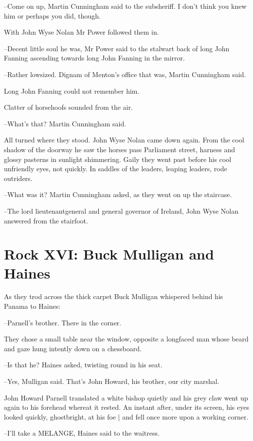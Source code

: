 --Come on up,
Martin Cunningham said to the subsheriff.
I don't think you
knew him
or perhaps you did, though.

With John Wyse Nolan
Mr Power followed them in.

--Decent little soul he was,
Mr Power said
to the stalwart back of long
John Fanning
ascending towards long John Fanning in the mirror.

--Rather lowsized.
Dignam of Menton's office that was,
Martin Cunningham
said.

Long John Fanning could not remember him.%

Clatter of horsehoofs sounded from the air.

--What's that? Martin Cunningham said.

All turned where they stood.
John Wyse Nolan came down again.
From the
cool shadow of the doorway
he saw the horses pass Parliament street,
harness and glossy pasterns in sunlight shimmering.
Gaily they went past
before his cool unfriendly eyes,
not quickly.
In saddles of the leaders,
leaping leaders,
rode outriders.

--What was it?
Martin Cunningham asked,
as they went on up the staircase.

--The lord lieutenantgeneral and general governor of Ireland,
John Wyse Nolan answered from the stairfoot.


\section*{Rock XVI: Buck Mulligan and Haines}


As they trod across the thick carpet
Buck Mulligan whispered behind
his Panama to Haines:

--Parnell's brother.
There in the corner.

They chose a small table near the window,
opposite a longfaced man
whose beard and gaze hung intently down on a chessboard.

--Is that he?
Haines asked,
twisting round in his seat.

--Yes,
Mulligan said.
That's John Howard, his brother, our city marshal.

John Howard Parnell translated a white bishop quietly
and his grey claw went up again to his forehead
whereat it rested.
An instant after,
under its screen,
his eyes looked quickly, ghostbright, at his foe |
and fell once more upon a working corner.

--I'll take a MELANGE,
Haines said to the waitress.

